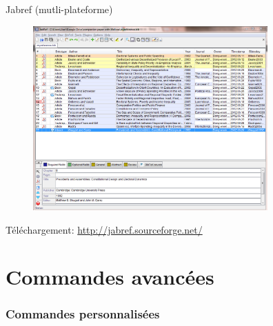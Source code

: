 \documentclass{beamer}
\begin{document}
\begin{frame}{Jabref (mutli-plateforme)}

\vspace*{-0.5cm}
\begin{figure}
\centering
\includegraphics[width=9cm]{img/jabref}
\end{figure}

\vspace*{-0.5cm}
{\footnotesize Téléchargement: \url{http://jabref.sourceforge.net/}}

\end{frame}




\part{Commandes avancées}

\section{Commandes personnalisées}
\end{document}
